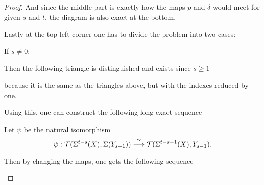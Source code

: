 \begin{proof}
    And since the middle part is exactly how the maps \( p \) and \( \delta \) would meet for given \( s \) and \( t \), the diagram is also exact at the bottom.

    Lastly at the top left corner one has to divide the problem into two cases:

    If \( s \neq 0 \):

    Then the following triangle is distinguished and exists since \( s \geq 1 \)
    \begin{center}
    \end{center}
    because it is the same as the triangles above, but with the indexes reduced by one.

    Using this, one can construct the following long exact sequence
    \begin{center}
    \end{center}

    Let \( \psi \) be the natural isomorphism
    \[
        \psi: {\mathcal{T}}(\Sigma^{t-s}(X), \Sigma(Y_{s - 1})) \stackrel{\cong}{\longrightarrow} {\mathcal{T}}(\Sigma^{t - s - 1}(X), Y_{s - 1}).
    \]

    Then by changing the maps, one gets the following sequence
    \begin{center}
\end{center}
\end{proof}
